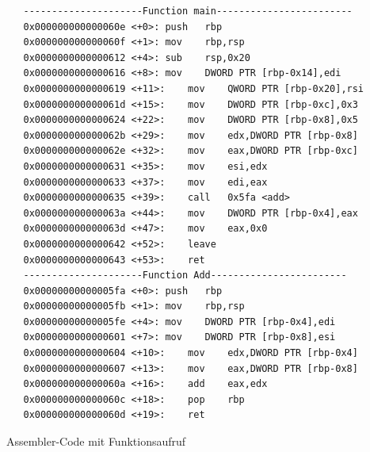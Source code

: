\documentclass[12pt]{article}
\begin{document}
\begin{code}[!htb]
\begin{lstlisting}
   ---------------------Function main------------------------
   0x000000000000060e <+0>:	push   rbp
   0x000000000000060f <+1>:	mov    rbp,rsp
   0x0000000000000612 <+4>:	sub    rsp,0x20
   0x0000000000000616 <+8>:	mov    DWORD PTR [rbp-0x14],edi
   0x0000000000000619 <+11>:	mov    QWORD PTR [rbp-0x20],rsi
   0x000000000000061d <+15>:	mov    DWORD PTR [rbp-0xc],0x3
   0x0000000000000624 <+22>:	mov    DWORD PTR [rbp-0x8],0x5
   0x000000000000062b <+29>:	mov    edx,DWORD PTR [rbp-0x8]
   0x000000000000062e <+32>:	mov    eax,DWORD PTR [rbp-0xc]
   0x0000000000000631 <+35>:	mov    esi,edx
   0x0000000000000633 <+37>:	mov    edi,eax
   0x0000000000000635 <+39>:	call   0x5fa <add>
   0x000000000000063a <+44>:	mov    DWORD PTR [rbp-0x4],eax
   0x000000000000063d <+47>:	mov    eax,0x0
   0x0000000000000642 <+52>:	leave  
   0x0000000000000643 <+53>:	ret      
   ---------------------Function Add------------------------
   0x00000000000005fa <+0>:	push   rbp
   0x00000000000005fb <+1>:	mov    rbp,rsp
   0x00000000000005fe <+4>:	mov    DWORD PTR [rbp-0x4],edi
   0x0000000000000601 <+7>:	mov    DWORD PTR [rbp-0x8],esi
   0x0000000000000604 <+10>:	mov    edx,DWORD PTR [rbp-0x4]
   0x0000000000000607 <+13>:	mov    eax,DWORD PTR [rbp-0x8]
   0x000000000000060a <+16>:	add    eax,edx
   0x000000000000060c <+18>:	pop    rbp
   0x000000000000060d <+19>:	ret    
\end{lstlisting}
\caption[Assembler Code Funktionen]{Assembler-Code mit Funktionsaufruf}
\label{code:funktionasm}
\end{code}


\newpage
\end{document}
